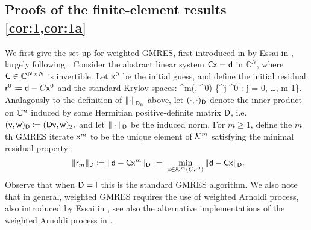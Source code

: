 %

\subsection{Proofs of the finite-element results \cref{cor:1,cor:1a}}\label{sec:mainproofs}

We first give the set-up for weighted GMRES, first introduced in by Essai in \cite{Es:98}, largely following \cite[Section 5]{GrSpVa:17}. Consider the abstract  linear system 
$\mathsf{C} \mathsf{x} = \mathsf{d}$
in $\mathbb{C}^N$, where $\mathsf{C} \in \mathbb C^{N\times N}$ is invertible. Let $\mathsf{x}^{0}$ be the initial guess, and define the initial residual $\mathsf{r}^0 \coloneqq \mathsf{d}- C \mathsf{x}^0$ and the standard Krylov spaces:  
\beqs  
\cK^m(\Cmat, \rvec^0) \de {}\big\{\matrixC^j \rvec^0 : j = 0, \ldots, m-1\big\}.
\eeqs
Analagously to the definition of $\NDk{\cdot}$ above, let $(\cdot , \cdot )_{\mathsf{D}}$ denote the inner product on $\mathbb C^n$ 
induced by some Hermitian positive-definite matrix $\mathsf{D}$, i.e.~
$(\mathsf{v},\mathsf{w})_{\mathsf{D}} \coloneqq (\mathsf{D} \mathsf{v}, \mathsf{w})_2,$
and let $\Vert \cdot \Vert_{\mathsf{D}}$ be the induced norm. For $m \geq 1$, define the $m$th GMRES iterate $\mathsf{x}^m$  to be  the unique element of $\mathcal K^m$ satisfying  the  
 minimal residual  property: 
$$ \ \Vert \rvecm \Vert_\Dmat \de \Vert \dvec - \matrixC \xvec^m \Vert_\Dmat \ = \ \min_{\xvec \in \cK^m(C, \rvec^0)} \Vert {\dvec} - {\matrixC} {\xvec} \Vert_\Dmat. $$
Observe that when $\mathsf{D} = \mathsf{I}$ this is the standard GMRES algorithm. We also note that in general, weighted GMRES requires the use of weighted Arnoldi process, also introduced by Essai in \cite{Es:98}, see also the alternative implementations of the weighted Arnoldi process in \cite{GuPe:14}.


